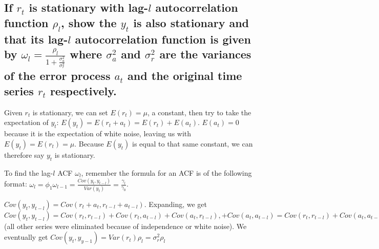 \documentclass{article}
\begin{document}
\subsection{If $r_{t}$ is stationary with lag-$l$ autocorrelation function $\rho_{l}$, show the $y_{t}$ is also stationary and that its lag-$l$ autocorrelation function is given by $\omega_{l} = \frac{\rho_{l}}{1 + \frac{\sigma_{a}^{2}}{\sigma_{r}^{2}}}$ where $\sigma_{a}^{2}$ and $\sigma_{r}^{2}$ are the variances of the error process $a_{t}$ and the original time series $r_{t}$ respectively.}

\par\noindent\Large Given $r_{t}$ is stationary, we can set $E(r_{t}) = \mu$, a constant, then try to take the expectation of $y_{t}$: $E(y_{t}) = E(r_{t} + a_{t}) = E(r_{t}) + E(a_{t})$.  $E(a_{t}) = 0$ because it is the expectation of white noise, leaving us with $E(y_{t}) = E(r_{t}) = \mu$.  Because $E(y_{t})$ is equal to that same constant, we can therefore say $y_{t}$ is stationary.\vspace{0.25cm}

\par\noindent\Large To find the lag-$l$ ACF $\omega_{l}$, remember the formula for an ACF is of the following format: $\omega_{l} = \phi_{1}\omega_{l - 1} = \frac{Cov(y_{t}, y_{t - l})}{Var(y_{t})} = \frac{\gamma_{l}}{\gamma_{0}}$.\vspace{0.25cm}

\par\noindent\Large $Cov(y_{t}, y_{t - l}) = Cov(r_{t} + a_{t}, r_{t - l} + a_{t - l})$.  Expanding, we get $Cov(y_{t}, y_{t - l}) = Cov(r_{t}, r_{t - l}) + Cov(r_{t}, a_{t - l}) + Cov(a_{t}, r_{t - l}), + Cov(a_{t}, a_{t - l}) = Cov(r_{t}, r_{t - l}) + Cov(a_{t}, a_{t - l}) = Cov(r_{t}, r_{t - 1})$ (all other series were eliminated because of independence or white noise).  We eventually get $Cov(y_{t}, y_{y - 1}) = Var(r_{t})\rho_{l} = \sigma_{r}^{2}\rho_{l}$\vspace{0.25cm}


\end{document}
